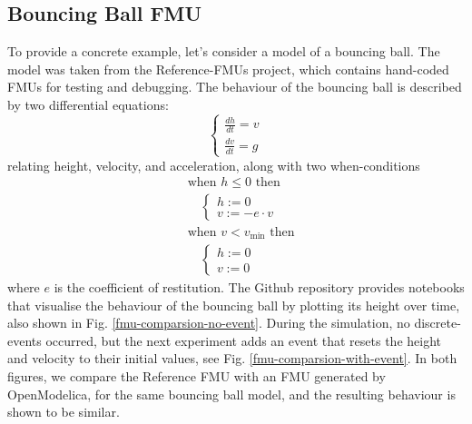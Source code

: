 \documentclass[conference]{IEEEtran}
\begin{document}
\subsection{Bouncing Ball FMU}

To provide a concrete example, let's consider a model of a bouncing ball.
The model was taken from the Reference-FMUs project, which contains hand-coded FMUs for testing and debugging.
The behaviour of the bouncing ball is described by two differential equations:
\[
\begin{cases}
\frac{dh}{dt} = v \\
\frac{dv}{dt} = g
\end{cases}
\]
relating height, velocity, and acceleration, along with two when-conditions
\[
\begin{aligned}
&\text{when } h \leq 0 \text{ then} \\
&\quad \begin{cases}
h := 0 \\
v := -e \cdot v
\end{cases} \\
&\text{when } v < v_{\text{min}} \text{ then} \\
&\quad \begin{cases}
h := 0 \\
v := 0
\end{cases}
\end{aligned}
\]
where $e$ is the coefficient of restitution.
The Github repository provides notebooks that visualise the behaviour of the bouncing ball by plotting its height over time, also shown in Fig. \ref{fmu-comparsion-no-event}.
During the simulation, no discrete-events occurred, but the next experiment adds an event that resets the height and velocity to their initial values, see Fig. \ref{fmu-comparsion-with-event}.
In both figures, we compare the Reference FMU with an FMU generated by OpenModelica, for the same bouncing ball model, and the resulting behaviour is shown to be similar.
\end{document}
